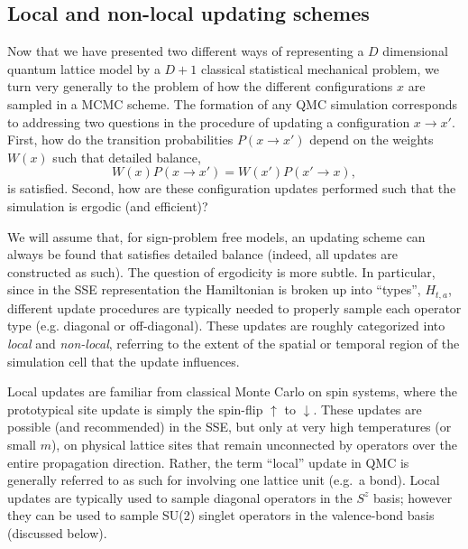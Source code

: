 \documentclass[vecphys]{svmult}
\begin{document}
\subsection{Local and non-local updating schemes} \label{Melko:updates}

Now that we have presented two different ways of representing a $D$ dimensional quantum lattice model by a $D+1$ classical statistical mechanical problem, we turn very generally to the problem of how the different configurations $x$ are sampled in a MCMC scheme.
The formation of any QMC simulation corresponds to addressing two questions in the procedure of updating a configuration $x \rightarrow x'$. First, how do the transition probabilities $P(x \rightarrow x')$ depend on the weights $W(x)$ such that detailed balance,
\begin{equation}
 W(x)P(x \rightarrow x') = W(x')P(x' \rightarrow x), \label{detb}
 \end{equation}
 is satisfied. Second, how are these configuration updates performed such that the simulation is ergodic (and efficient)?

We will assume that, for sign-problem free models, an updating scheme can always be found that satisfies detailed balance (indeed, all updates are constructed as such).  The question of ergodicity is more subtle.  
In particular, since in the SSE representation the Hamiltonian is broken up into ``types'', $H_{t,a}$, different update procedures are typically needed to properly sample each operator type (e.g. diagonal or off-diagonal).  These updates are roughly categorized into {\em local} and {\em non-local}, referring to the extent of the spatial or temporal region of the simulation cell that the update influences.

Local updates are familiar from classical Monte Carlo on spin systems, where the prototypical site update is simply the spin-flip $\uparrow$ to $\downarrow$.  These updates are possible (and recommended) in the SSE, but only at very high temperatures (or small $m$), on physical lattice sites that remain unconnected by operators over the entire propagation direction.  Rather, the term ``local'' update in QMC is generally referred to as such for involving one lattice unit (e.g.~a bond).  Local updates are typically used to sample diagonal operators in the $S^z$ basis; however they can be used to sample SU(2) singlet operators in the valence-bond basis (discussed below).
\end{document}
